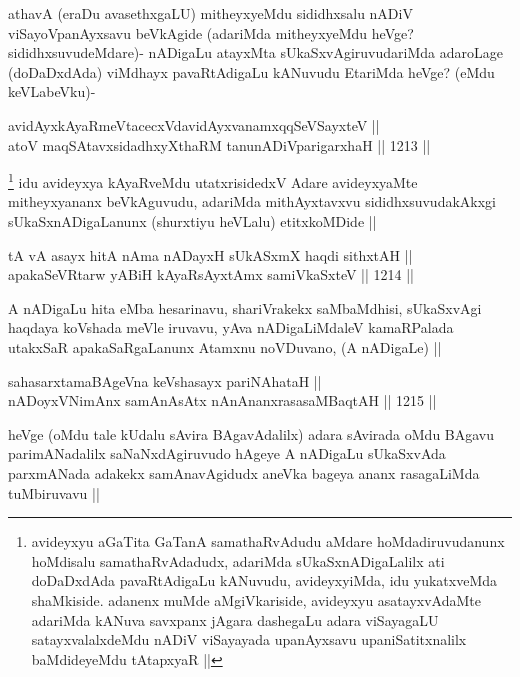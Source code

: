 \begin{artha}
athavA (eraDu avasethxgaLU) mitheyxyeMdu sididhxsalu nADiV viSayoVpanAyxsavu beVkAgide (adariMda mitheyxyeMdu heVge? sididhxsuvudeMdare)- nADigaLu atayxMta sUkaSxvAgiruvudariMda adaroLage (doDaDxdAda) viMdhayx pavaRtAdigaLu kANuvudu EtariMda heVge? (eMdu keVLabeVku)-
\end{artha}

\begin{shl}
avidAyxkAyaRmeVtacecxVdavidAyxvanamxqqSeVSayxteV || \\
atoV maqSAtavxsidadhxyXthaRM tanunADiVparigarxhaH ||  1213 ||  
\end{shl}

\begin{artha}
\footnote{avideyxyu aGaTita GaTanA samathaRvAdudu aMdare hoMdadiruvudanunx hoMdisalu samathaRvAdadudx, adariMda sUkaSxnADigaLalilx ati doDaDxdAda pavaRtAdigaLu kANuvudu, avideyxyiMda, idu yukatxveMda shaMkiside. adanenx muMde aMgiVkariside, avideyxyu asatayxvAdaMte adariMda kANuva savxpanx jAgara dashegaLu adara viSayagaLU satayxvalalxdeMdu nADiV viSayayada upanAyxsavu upaniSatitxnalilx baMdideyeMdu tAtapxyaR ||}
idu avideyxya kAyaRveMdu utatxrisidedxV Adare avideyxyaMte mitheyxyananx beVkAguvudu, adariMda mithAyxtavxvu sididhxsuvudakAkxgi sUkaSxnADigaLanunx (shurxtiyu heVLalu) etitxkoMDide ||
\end{artha}


\begin{shl}
tA vA asayx hitA nAma nADayxH sUkASxmX haqdi sithxtAH || \\
apakaSeVRtarw yABiH kAyaRsAyx\s \s tAmx samiVkaSxteV ||  1214 ||  
\end{shl}

\begin{artha}
A nADigaLu hita eMba hesarinavu, shariVrakekx saMbaMdhisi, sUkaSxvAgi haqdaya koVshada meVle iruvavu, yAva nADigaLiMdaleV kamaRPalada utakxSaR apakaSaRgaLanunx Atamxnu noVDuvano, (A nADigaLe) ||
\end{artha}


\begin{shl}
sahasarxtamaBAgeVna keVshasayx pariNAhataH || \\
nADoyxV\s NimAnx samAnAsAtx nAnAnanxrasasaMBaqtAH ||  1215 ||  
\end{shl}

\begin{artha}
heVge (oMdu tale kUdalu sAvira BAgavAdalilx) adara sAvirada oMdu BAgavu parimANadalilx saNaNxdAgiruvudo hAgeye A nADigaLu sUkaSxvAda parxmANada adakekx samAnavAgidudx aneVka bageya ananx rasagaLiMda tuMbiruvavu ||
\end{artha}

